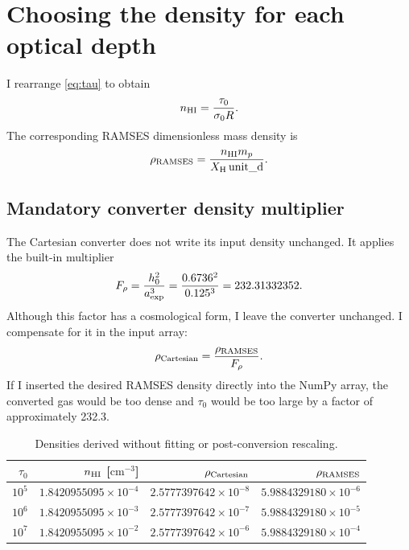 \documentclass[11pt,a4paper]{article}
\newcommand{\tauzero}{\tau_0}
\newcommand{\nhi}{n_{\rm HI}}
\begin{document}
\section{Choosing the density for each optical depth}

I rearrange \ref{eq:tau} to obtain
\begin{equation}
\nhi=\frac{\tauzero}{\sigma_0 R}.
\end{equation}
The corresponding RAMSES dimensionless mass density is
\begin{equation}
\rho_{\rm RAMSES}=\frac{\nhi m_p}{X_{\rm H}\,\mathrm{unit\_d}}.
\label{eq:rhoramses}
\end{equation}

\subsection{Mandatory converter density multiplier}

The Cartesian converter does not write its input density unchanged.  It applies
the built-in multiplier
\begin{equation}
F_\rho=\frac{h_0^2}{a_{\rm exp}^3}
=\frac{0.6736^2}{0.125^3}
=232.31332352.
\label{eq:factor}
\end{equation}
Although this factor has a cosmological form, I leave the converter unchanged.
I compensate for it in the input array:
\begin{equation}
\rho_{\rm Cartesian}=\frac{\rho_{\rm RAMSES}}{F_\rho}.
\label{eq:cartdensity}
\end{equation}
If I inserted the desired RAMSES density directly into the NumPy array, the
converted gas would be too dense and $\tauzero$ would be too large by a factor
of approximately 232.3.

\begin{table}[ht]
\centering
\caption{Densities derived without fitting or post-conversion rescaling.}
\label{tab:density}
\begin{tabular}{rrrr}
\toprule
$\tauzero$ & $\nhi$ [$\mathrm{cm^{-3}}$] & $\rho_{\rm Cartesian}$ & $\rho_{\rm RAMSES}$\\
\midrule
$10^5$ & $1.8420955095\times10^{-4}$ & $2.5777397642\times10^{-8}$ & $5.9884329180\times10^{-6}$\\
$10^6$ & $1.8420955095\times10^{-3}$ & $2.5777397642\times10^{-7}$ & $5.9884329180\times10^{-5}$\\
$10^7$ & $1.8420955095\times10^{-2}$ & $2.5777397642\times10^{-6}$ & $5.9884329180\times10^{-4}$\\
\bottomrule
\end{tabular}
\end{table}
\end{document}
